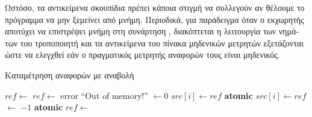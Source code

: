 \begin{greek}
Ωστόσο, τα αντικείμενα σκουπίδια πρέπει κάποια στιγμή να
συλλεγούν αν θέλουμε το πρόγραμμα να μην ξεμείνει από μνήμη.
Περιοδικά, για παράδειγμα όταν ο εκχωρητής αποτύχει να
επιστρέψει μνήμη στη συνάρτηση \textenglish{}, διακόπτεται
η λειτουργία των νημάτων του τροποποιητή και τα αντικείμενα
του πίνακα μηδενικών μετρητών εξετάζονται ώστε να ελεγχθεί
εάν ο πραγματικός μετρητής αναφορών τους είναι μηδενικός.

\begin{algorithm}
  \caption{Καταμέτρηση αναφορών με αναβολή}
  \label{alg:refcnt_2}
  \begin{algorithmic}[1]
      \State $ref \gets$ 
        \State {}
        \State $ref \gets$ 
          \State error ``Out of memory!''
        \EndIf
      \EndIf
      \State {} $\gets 0$
      \State {}
      \State {}
    \EndFunction
    \Statex
        \State $src[i] \gets ref$
      \Else
        \State \textbf{atomic}
        \State {}
        \State {}
        \State {}
        \State $src[i] \gets ref$
      \EndIf
    \EndProcedure
    \Statex
        \State {} $\gets$  $-1$
          \State {} 
        \EndIf
      \EndIf
    \EndProcedure
    \Statex
      \State \textbf{atomic}
       
        \State {}
      \EndFor
      \State {}
       
        \State {}
      \EndFor
    \EndProcedure
    \Statex
        \State $ref \gets$ 
         
            \State {}
          \EndFor
          \State {}
        \EndIf
      \EndWhile
    \EndProcedure
  \end{algorithmic}
\end{algorithm}


\end{greek}
